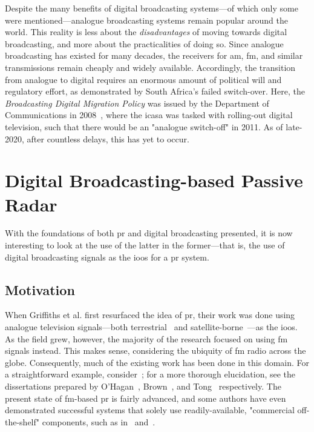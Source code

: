 \documentclass[class=report,11pt,crop=false]{standalone}
\begin{document}
Despite the many benefits of digital broadcasting systems---of which only some were mentioned---analogue broadcasting systems remain popular around the world. This reality is less about the \emph{disadvantages} of moving towards digital broadcasting, and more about the practicalities of doing so. Since analogue broadcasting has existed for many decades, the receivers for \gls{am}, \gls{fm}, and similar transmissions remain cheaply and widely available. Accordingly, the transition from analogue to digital requires an enormous amount of political will and regulatory effort, as demonstrated by South Africa's failed switch-over. Here, the \emph{Broadcasting Digital Migration Policy} was issued by the Department of Communications in 2008~\cite{icasaNotice2008}, where the \gls{icasa} was tasked with rolling-out digital television, such that there would be an "analogue switch-off" in 2011. As of late-2020, after countless delays, this has yet to occur.

\section{Digital Broadcasting-based Passive Radar}
With the foundations of both \gls{pr} and digital broadcasting presented, it is now interesting to look at the use of the latter in the former---that is, the use of digital broadcasting signals as the \gls{ioo}s for a \gls{pr} system.

\subsection{Motivation}
When Griffiths et al. first resurfaced the idea of \gls{pr}, their work was done using analogue television signals---both terrestrial~\cite{Griffiths1986} and satellite-borne~\cite{Griffiths1992}---as the \gls{ioo}s. As the field grew, however, the majority of the research focused on using \gls{fm} signals instead. This makes sense, considering the ubiquity of \gls{fm} radio across the globe. Consequently, much of the existing work has been done in this domain. For a straightforward example, consider~\cite{OHagan2007}; for a more thorough elucidation, see the dissertations prepared by O'Hagan~\cite{o2009passive}, Brown~\cite{brown2013fm}, and Tong~\cite{tong2014} respectively. The present state of \gls{fm}-based \gls{pr} is fairly advanced, and some authors have even demonstrated successful systems that solely use readily-available, "commercial off-the-shelf" components, such as in~\cite{Tong2015} and~\cite{Moser2019}.
\end{document}
